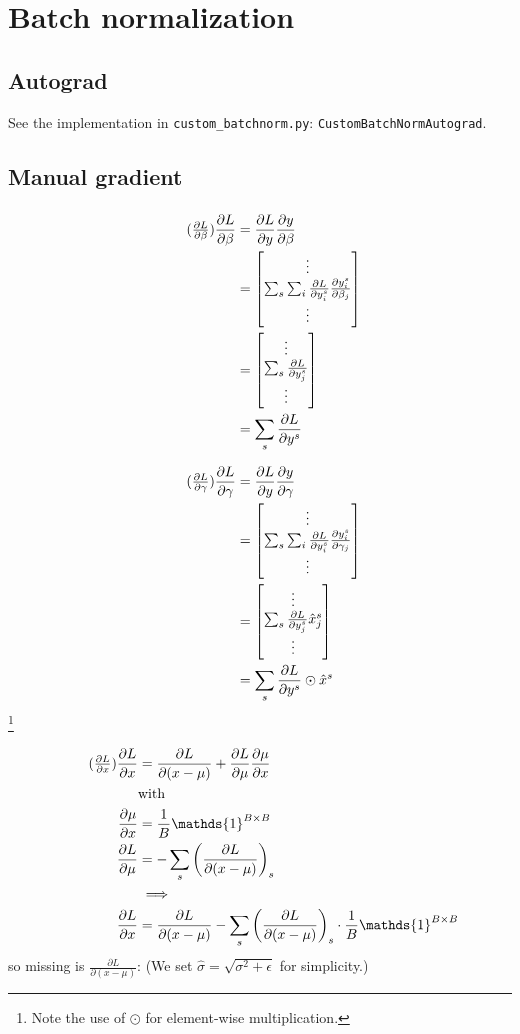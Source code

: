 \documentclass{article}
\newcommand\bM[1]{\ensuremath{\begin{bmatrix}#1\end{bmatrix}}}
\newcommand\·{\ensuremath{\cdot}}
\newcommand\…{\ensuremath{\dots}}
\renewcommand\t{\ensuremath{\times}}
\newcommand{\⇔}{\ensuremath{\iff}}
\newcommand{\⇐}{\ensuremath{\impliedby}}
\newcommand{\⇒}{\ensuremath{\implies}}
\newcommand\f[2]{\ensuremath{\frac{#1}{#2}}}
\newcommand\pf[2]{\ensuremath{\frac{\partial {#1}}{\partial {#2}}}}
\newcommand\1{\ensuremath{\mathds{1}}}
\newcommand\ℝ{\ensuremath{\mathds{R}}}
\begin{document}
\section{Batch normalization}
\subsection{Autograd}
See the implementation in \texttt{custom\_batchnorm.py}: \texttt{CustomBatchNormAutograd}.

\subsection{Manual gradient}
\subsubsection{}
\begin{align*}
  \tag{$\pf{L}{\beta}$}
  \pf{L}{\beta}
  &= \pf{L}{y} \pf{y}{\beta}\\
  &= \bM{\vdots\\ \sum_s\sum_i \pf{L}{y_i^s} \pf{y_i^s}{\beta_j}\\ \vdots}\\
  &= \bM{\vdots\\ \sum_s\pf{L}{y_j^s} \\\vdots}\\
  &= \sum_s\pf{L}{y^s}
\end{align*}

\begin{align*}
  \tag{$\pf{L}{\gamma}$}
  \pf{L}{\gamma}
  &= \pf{L}{y} \pf{y}{\gamma}\\
  &= \bM{\vdots\\ \sum_s\sum_i \pf{L}{y_i^s} \pf{y_i^s}{\gamma_j}\\\vdots}\\
  &= \bM{\vdots\\ \sum_s\pf{L}{y_j^s} \hat{x}_j^s\\\vdots}\\
  &= \sum_s \pf{L}{y^s}\odot\hat{x}^s
\end{align*}
\footnote{Note the use of $\odot$ for element-wise multiplication.}

\begin{align*}
  \tag{\pf{L}{x}}
  \pf{L}{x} &= \pf{L}{(x-\mu)} + \pf{L}{\mu}\pf{\mu}{x}\\
  &\text{with}\\
  \pf{\mu}{x} &= \f{1}{B}\1^{B\t B}\\
  \pf{L}{\mu} &= -\sum_s\left(\pf{L}{(x-\mu)}\right)_s\\
  &\⇒\\
  \pf{L}{x} &= \pf{L}{(x-\mu)} -\sum_s\left(\pf{L}{(x-\mu)}\right)_s\·\f{1}{B}\1^{B\t B}
\end{align*}
so missing is $\pf{L}{(x-\mu)}$: (We set $\hat{\sigma} = \sqrt{\sigma^2 + \epsilon}$ for simplicity.)
\end{document}
